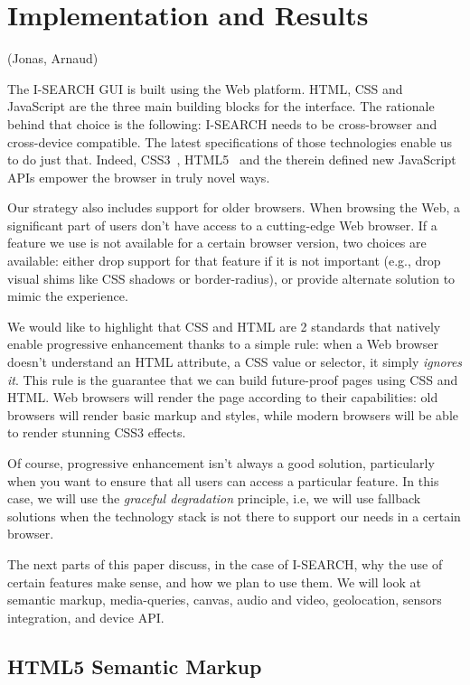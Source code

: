 \documentclass[runningheads,a4paper]{llncs} \usepackage[utf8]{inputenc}
\begin{document}
\section{Implementation and Results}
(Jonas, Arnaud)

The \mbox{I-SEARCH} GUI is built using the Web platform. HTML, CSS and JavaScript are the three main building blocks for the interface. The rationale behind that choice is the following: \mbox{I-SEARCH} needs to be cross-browser and cross-device compatible. The latest specifications of those technologies enable us to do just that. Indeed, CSS3~\cite{css3}, HTML5~\cite{html5} and the therein defined new JavaScript APIs empower the browser in truly novel ways.

Our strategy also includes support for older browsers. When browsing the Web, a significant part of users don't have access to a cutting-edge Web browser. If a feature we use is not available for a certain browser version, two choices are available: either drop support for that feature if it is not important (e.g., drop visual shims like CSS shadows or border-radius), or provide alternate solution to mimic the experience. 

We would like to highlight that CSS and HTML are 2 standards that natively enable progressive enhancement thanks to a simple rule: when a Web browser doesn't understand an HTML attribute, a CSS value or selector, it simply \emph{ignores it}. This rule is the guarantee that we can build future-proof pages using CSS and HTML. Web browsers will render the page according to their capabilities: old browsers will render basic markup and styles, while modern browsers will be able to render stunning CSS3 effects.

Of course, progressive enhancement isn't always a good solution, particularly when you want to ensure that all users can access a particular feature. In this case, we will use the \emph{graceful degradation} principle, i.e, we will use fallback solutions when the technology stack is not there to support our needs in a certain browser. 

The next parts of this paper discuss, in the case of \mbox{I-SEARCH}, why the use of certain features make sense, and how we plan to use them. We will look at semantic markup, media-queries, canvas, audio and video, geolocation, sensors integration, and device API.

\subsection{HTML5 Semantic Markup} 
\end{document}
